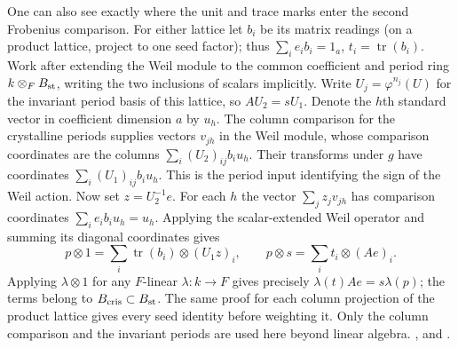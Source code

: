 One can also see exactly where the unit and trace marks enter the
second Frobenius comparison. For either lattice let \(b_i\) be its
matrix readings (on a product lattice, project to one seed factor);
thus \(\sum_i e_i b_i=1_a\), \(t_i=\operatorname{tr}(b_i)\).
Work after extending the Weil module to the common coefficient and
period ring \(k\otimes_F B_{\rm st}\), writing the two inclusions of
scalars implicitly. Write \(U_j=\varphi^{n_j}(U)\) for the invariant
period basis of this lattice, so \(AU_2=sU_1\). Denote the \(h\)th
standard vector in coefficient dimension \(a\) by \(u_h\).
The column comparison for the crystalline periods supplies vectors
\(v_{jh}\) in the Weil module, whose comparison coordinates are the
columns \(\sum_i (U_2)_{ij}b_i u_h\). Their transforms under \(g\)
have coordinates \(\sum_i (U_1)_{ij}b_i u_h\). This is the period
input identifying the sign of the Weil action. Now set \(z=U_2^{-1}e\).
For each \(h\) the vector \(\sum_j z_jv_{jh}\) has comparison
coordinates \(\sum_i e_i b_i u_h=u_h\).
Applying the scalar-extended Weil operator and summing its diagonal
coordinates gives
\[
 p\otimes 1=\sum_i \operatorname{tr}(b_i)\otimes(U_1z)_i,\qquad
 p\otimes s=\sum_i t_i\otimes(Ae)_i .
\]
Applying \(\lambda\otimes1\) for any \(F\)-linear \(\lambda:k\to F\)
gives precisely \(\lambda(t)Ae=s\lambda(p)\); the terms belong to
\(B_{\rm cris}\subset B_{\rm st}\). The same proof for each column
projection of the product lattice gives every seed identity before
weighting it. Only the column comparison and the invariant periods
are used here beyond linear algebra.
,
and .

